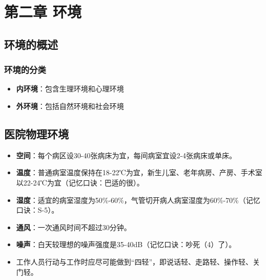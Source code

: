 \documentclass[11pt, a4paper]{ctexart}
\newcommand{\ocrimage}[1]{\texttt{#1}}
\begin{document}


\section{第二章 环境}
\subsection{环境的概述}
\subsubsection{环境的分类}
\begin{itemize}
	\item \textbf{内环境}：包含生理环境和心理环境
	\item \textbf{外环境}：包括自然环境和社会环境
\end{itemize}

\subsection{医院物理环境}
\begin{itemize}
	\item \textbf{空间}：每个病区设30-40张病床为宜，每间病室宜设2-4张病床或单床。
	\item \textbf{温度}：普通病室温度保持在18-22℃为宜，新生儿室、老年病房、产房、手术室以22-24℃为宜（记忆口诀：巴适的很）。
	\item \textbf{湿度}：适宜的病室湿度为50\%-60\%，气管切开病人病室湿度为60\%-70\%（记忆口诀：S-5）。
	\item \textbf{通风}：一次通风时间不超过30分钟。
	\item \textbf{噪声}：白天较理想的噪声强度是35-40dB（记忆口诀：吵死（4）了）。
	\item 工作人员行动与工作时应尽可能做到“四轻”，即说话轻、走路轻、操作轻、关门轻。
\end{itemize}
\end{document}
